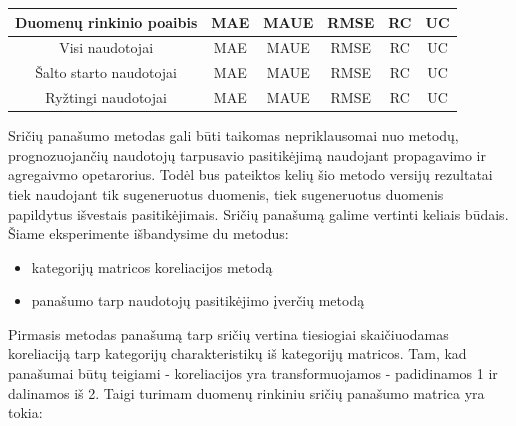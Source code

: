 \documentclass{VUMIFInfMagistrinis}
\begin{document}
\begin{center}
	\begin{tabular}{||c c c c c c||} 
		Duomenų rinkinio poaibis & MAE & MAUE & RMSE & RC & UC \\
		\hline
		Visi naudotojai & MAE & MAUE & RMSE & RC & UC \\
		\hline
		Šalto starto naudotojai & MAE & MAUE & RMSE & RC & UC \\
		\hline
		Ryžtingi naudotojai & MAE & MAUE & RMSE & RC & UC \\
	\end{tabular}
\end{center}
\indent
Sričių panašumo metodas gali būti taikomas nepriklausomai nuo metodų, prognozuojančių naudotojų tarpusavio pasitikėjimą naudojant propagavimo ir agregaivmo opetarorius. Todėl bus pateiktos kelių šio metodo versijų rezultatai tiek naudojant tik sugeneruotus duomenis, tiek sugeneruotus duomenis papildytus išvestais pasitikėjimais.
\newline
\indent
Sričių panašumą galime vertinti keliais būdais. Šiame eksperimente išbandysime du metodus:
\begin{itemize}
	\item kategorijų matricos koreliacijos metodą
	\item panašumo tarp naudotojų pasitikėjimo įverčių metodą
\end{itemize}
Pirmasis metodas panašumą tarp sričių vertina tiesiogiai skaičiuodamas koreliaciją tarp kategorijų charakteristikų iš kategorijų matricos. Tam, kad panašumai būtų teigiami - koreliacijos yra transformuojamos - padidinamos 1 ir dalinamos iš 2. Taigi turimam duomenų rinkiniu sričių panašumo matrica yra tokia:
\end{document}
